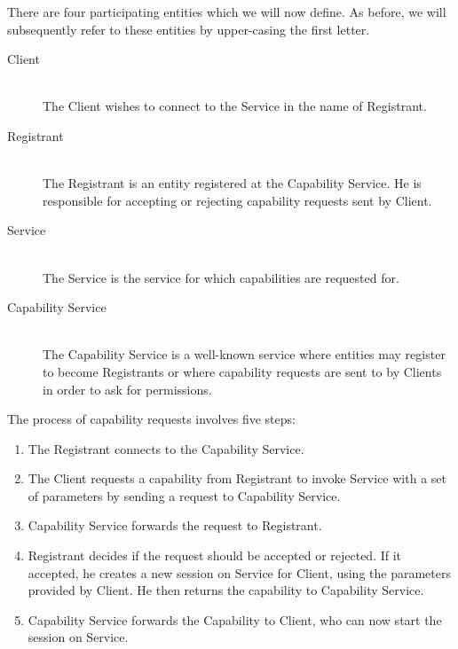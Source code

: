 There are four participating entities which we will now define.
As before, we will subsequently refer to these entities by upper-casing the first letter.
\begin{description}
    \item[Client]\hfill\\
        The Client wishes to connect to the Service in the name of Registrant.
    \item[Registrant]\hfill\\
        The Registrant is an entity registered at the Capability Service.
        He is responsible for accepting or rejecting capability requests sent by Client.
    \item[Service]\hfill\\
        The Service is the service for which capabilities are requested for.
    \item[Capability Service]\hfill\\
        The Capability Service is a well-known service where entities may register to become Registrants or where capability requests are sent to by Clients in order to ask for permissions.
\end{description}

The process of capability requests involves five steps:
\begin{enumerate}
    \item The Registrant connects to the Capability Service.
    \item The Client requests a capability from Registrant to invoke Service with a set of parameters by sending a request to Capability Service.
    \item Capability Service forwards the request to Registrant.
    \item Registrant decides if the request should be accepted or rejected.
        If it accepted, he creates a new session on Service for Client, using the parameters provided by Client.
        He then returns the capability to Capability Service.
    \item Capability Service forwards the Capability to Client, who can now start the session on Service.
\end{enumerate}

